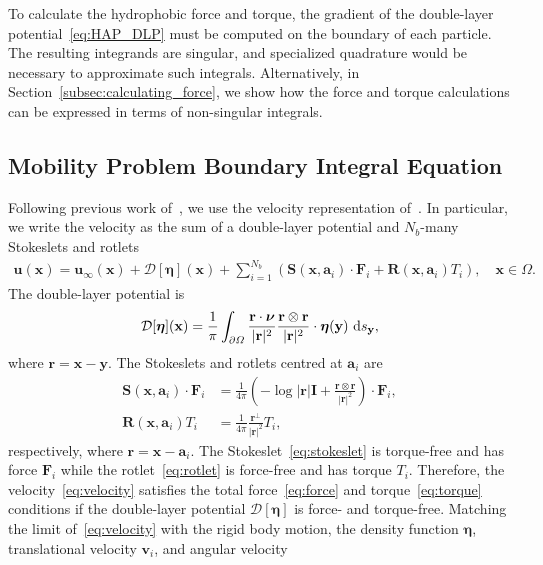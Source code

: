 \documentclass[lineno]{jfm}
\renewcommand{\aa}{\mathbf{a}}
\newcommand{\bd}{\partial}
\newcommand{\DD}{\mathcal{D}}
\newcommand{\eeta}{\boldsymbol{\eta}}
\newcommand{\FF}{\mathbf{F}}
\newcommand{\nnu}{\boldsymbol{\nu}}
\newcommand{\rr}{\mathbf{r}}
\newcommand{\RR}{\mathbf{R}}
\renewcommand{\SS}{\mathbf{S}}
\newcommand{\xx}{\mathbf{x}}
\newcommand{\uu}{\mathbf{u}}
\renewcommand{\vv}{\mathbf{v}}
\newcommand{\yy}{\mathbf{y}}
\begin{document}
To calculate the hydrophobic force and torque, the gradient of the
double-layer potential~\eqref{eq:HAP_DLP} must be computed on the
boundary of each particle. The resulting integrands are singular, and
specialized quadrature would be necessary to approximate such integrals.
Alternatively, in Section~\ref{subsec:calculating_force}, we show how
the force and torque calculations can be expressed in terms of
non-singular integrals.

\subsection{Mobility Problem Boundary Integral Equation}
Following previous work of~\cite{Lukas19}, we use the velocity
representation of~\cite{pow-mir1987}. In particular, we write the
velocity as the sum of a double-layer potential and $N_b$-many Stokeslets and
rotlets
\begin{align}
  \label{eq:velocity}
  \uu(\xx) = \uu_\infty(\xx) + \DD[\eeta](\xx) + 
    \sum_{i=1}^{N_b} \left(\SS(\xx,\aa_i) \cdot \FF_i + 
    \RR(\xx,\aa_i) T_i\right), \quad \xx \in \Omega.
\end{align}
The double-layer potential is
\begin{align}
  \DD[\eeta](\xx) = \frac{1}{\pi} \int_{\bd\Omega} 
    \frac{\rr \cdot \nnu}{|\rr|^2} \frac{\rr \otimes \rr}{|\rr|^2}
    \cdot \eeta(\yy) \, \dif s_\yy,
\end{align}
where $\rr = \xx - \yy$. The Stokeslets and rotlets centred at $\aa_i$
are
\begin{align}
\label{eq:stokeslet}
  \SS(\xx,\aa_i) \cdot \FF_i &= \frac{1}{4\pi} \left(-\log |\rr|\mathbf{I} + 
    \frac{\rr \otimes \rr}{|\rr|^2}\right) \cdot \FF_i, \\
    \label{eq:rotlet}
  \RR(\xx,\aa_i) T_i &= \frac{1}{4\pi} \frac{\rr^\perp}{|\rr|^2} T_i,
\end{align}
respectively, where $\rr = \xx - \aa_i$. The Stokeslet~\eqref{eq:stokeslet}  is torque-free
and has force $\FF_i$ while the rotlet~\eqref{eq:rotlet} is force-free and has torque
$T_i$. Therefore, the velocity~\eqref{eq:velocity} satisfies the total
force~\eqref{eq:force} and torque~\eqref{eq:torque} conditions if the
double-layer potential $\DD[\eeta]$ is force- and torque-free.  Matching
the limit of~\eqref{eq:velocity} with the rigid body motion, 
%
the density function $\eeta$, translational velocity $\vv_i$, and angular velocity
\end{document}
